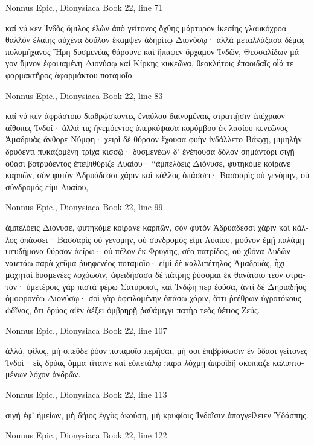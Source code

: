 \documentclass[12pt,letterpaper,twoside,final]{memoir}
\begin{document}
\begin{greek}
Nonnus Epic., Dionysiaca 
Book 22, line 71

καί νύ κεν Ἰνδὸς ὅμιλος ἑλὼν ἀπὸ γείτονος ὄχθης 
μάρτυρον ἱκεσίης γλαυκόχροα θαλλὸν ἐλαίης 
αὐχένα δοῦλον ἔκαμψεν ἀδηρίτῳ Διονύσῳ·   
ἀλλὰ μεταλλάξασα δέμας πολυμήχανος Ἥρη 
δυσμενέας θάρσυνε καὶ ἤπαφεν ὄρχαμον Ἰνδῶν, 
Θεσσαλίδων μάγον ὕμνον ἐφαψαμένη Διονύσῳ 
καὶ Κίρκης κυκεῶνα, θεοκλήτοις ἐπαοιδαῖς 
οἷά τε φαρμακτῆρος ἀφαρμάκτου ποταμοῖο. 



Nonnus Epic., Dionysiaca 
Book 22, line 83

καί νύ κεν ἀφράστοιο διαθρῴσκοντες ἐναύλου 
δαινυμέναις στρατιῇσιν ἐπέχραον αἴθοπες Ἰνδοί· 
ἀλλά τις ἠνεμόεντος ὑπερκύψασα κορύμβου 
ἐκ λασίου κενεῶνος Ἁμαδρυὰς ἄνθορε Νύμφη· 
χειρὶ δὲ θύρσον ἔχουσα φυὴν ἰνδάλλετο Βάκχῃ, 
μιμηλὴν δρυόεντι πυκαζομένη τρίχα κισσῷ· 
δυσμενέων δ' ἐνέπουσα δόλον σημάντορι σιγῇ 
οὔασι βοτρυόεντος ἐπεψιθύριζε Λυαίου· 
 “ἀμπελόεις Διόνυσε, φυτηκόμε κοίρανε καρπῶν, 
σὸν φυτὸν Ἀδρυάδεσσι χάριν καὶ κάλλος ὀπάσσει· 
Βασσαρὶς οὐ γενόμην, οὐ σύνδρομός εἰμι Λυαίου, 




Nonnus Epic., Dionysiaca 
Book 22, line 99

   ἀμπελόεις Διόνυσε, φυτηκόμε κοίρανε καρπῶν, 
σὸν φυτὸν Ἀδρυάδεσσι χάριν καὶ κάλλος ὀπάσσει· 
Βασσαρὶς οὐ γενόμην, οὐ σύνδρομός εἰμι Λυαίου, 
μοῦνον ἐμῇ παλάμῃ ψευδήμονα θύρσον ἀείρω· 
οὐ πέλον ἐκ Φρυγίης, σέο πατρίδος, οὐ χθόνα Λυδῶν   
ναιετάω παρὰ χεῦμα ῥυηφενέος ποταμοῖο· 
εἰμὶ δὲ καλλιπέτηλος Ἁμαδρυάς, ἧχι μαχηταὶ 
δυσμενέες λοχόωσιν, ἀφειδήσασα δὲ πάτρης 
ῥύσομαι ἐκ θανάτοιο τεὸν στρατόν· ὑμετέροις γὰρ 
πιστὰ φέρω Σατύροισι, καὶ Ἰνδῴη περ ἐοῦσα, 
ἀντὶ δὲ Δηριαδῆος ὁμοφρονέω Διονύσῳ· 
σοὶ γὰρ ὀφειλομένην ὀπάσω χάριν, ὅττι ῥεέθρων 
ὑγροτόκους ὠδῖνας, ὅτι δρύας αἰὲν ἀέξει 
ὀμβρηρῇ ῥαθάμιγγι πατὴρ τεὸς ὑέτιος Ζεύς. 



Nonnus Epic., Dionysiaca 
Book 22, line 107

ἀλλά, φίλος, μὴ σπεῦδε ῥόον ποταμοῖο περῆσαι, 
μή σοι ἐπιβρίσωσιν ἐν ὕδασι γείτονες Ἰνδοί· 
εἰς δρύας ὄμμα τίταινε καὶ εὐπετάλῳ παρὰ λόχμῃ 
ἀπροϊδῆ σκοπίαζε καλυπτομένων λόχον ἀνδρῶν. 



Nonnus Epic., Dionysiaca 
Book 22, line 113

σιγὴ ἐφ' ἡμείων, μὴ δήιος ἐγγὺς ἀκούσῃ, 
μὴ κρυφίοις Ἰνδοῖσιν ἀπαγγείλειεν Ὑδάσπης. 



Nonnus Epic., Dionysiaca 
Book 22, line 122


\end{greek}
\end{document}
